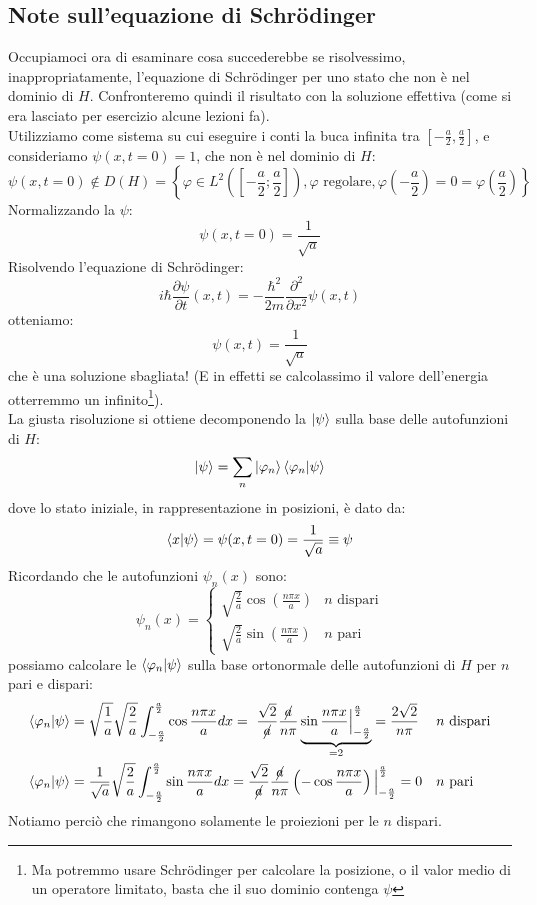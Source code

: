 \documentclass[../../FisicaTeorica.tex]{subfiles}
\begin{document}
\subsection{Note sull'equazione di Schrödinger}
Occupiamoci ora di esaminare cosa succederebbe se risolvessimo, inappropriatamente, l'equazione di Schrödinger per uno stato che non è nel dominio di $H$. Confronteremo quindi il risultato con la soluzione effettiva (come si era lasciato per esercizio alcune lezioni fa).\\
Utilizziamo come sistema su cui eseguire i conti la buca infinita tra $[-\frac{a}{2},\frac{a}{2}]$, e consideriamo $\psi(x,t=0)=1$, che non è nel dominio di $H$:
\[
\psi(x,t=0)\notin D(H) = \left\{\varphi\in L^2\left(\left[-\frac{a}{2}; \frac{a}{2}\right]\right), \varphi \text{ regolare}, \varphi\left(-\frac{a}{2}\right)=0=\varphi\left(\frac{a}{2}\right)\right\}
\]
Normalizzando la $\psi$:
\[
\psi(x,t=0)=\frac{1}{\sqrt{a}}
\]
Risolvendo l'equazione di Schrödinger:
\[
i\hbar \frac{\partial \psi}{\partial t}(x,t) = -\frac{\hbar^2}{2m}\frac{\partial^2}{\partial x^2}\psi(x,t)
\]
otteniamo:
\[
\psi(x,t)=\frac{1}{\sqrt{a}}
\]
che è una soluzione sbagliata! (E in effetti se calcolassimo il valore dell'energia otterremmo un infinito\footnote{Ma potremmo usare Schrödinger per calcolare la posizione, o il valor medio di un operatore limitato, basta che il suo dominio contenga $\psi$}).\\
La giusta risoluzione si ottiene decomponendo la $\ket{\psi}$ sulla base delle autofunzioni di $H$:
\[
\ket{\psi}=\sum_n \ket{\varphi_n}\braket{\varphi_n|\psi}
\]
dove lo stato iniziale, in rappresentazione in posizioni, è dato da:
\[
\braket{x|\psi}=\psi(x,t=0) = \frac{1}{\sqrt{a}} \equiv \psi
\]
Ricordando che le autofunzioni $\psi_n(x)$ sono:
\[
\psi_n(x) = \begin{cases}
\sqrt{\frac{2}{a}}\cos\left(\frac{n\pi x}{a}\right) & \text{$n$ dispari}\\
\sqrt{\frac{2}{a}}\sin\left(\frac{n\pi x}{a}\right) & \text{$n$ pari}
\end{cases}
\]
possiamo calcolare le  $\braket{\varphi_n|\psi}$ sulla base ortonormale delle autofunzioni di $H$ per $n$ pari e dispari:
\begin{align*}
\braket{\varphi_n|\psi}&=\sqrt{\frac{1}{a}}\sqrt{\frac{2}{a}}\int_{-\frac{a}{2}}^{\frac{a}{2}}\cos \frac{n\pi x}{a}dx =\ \frac{\sqrt{2}}{\cancel{a}} \frac{\cancel{a}}{n\pi}
\underbrace{\sin \frac{n\pi x}{a}\Big|_{-\frac{a}{2}}^{\frac{a}{2}}}_{=2}=\frac{2\sqrt{2}}{n\pi} && \text{$n$ dispari}\\
\braket{\varphi_n|\psi}&=\frac{1}{\sqrt{a}}\sqrt{\frac{2}{a}}\int_{-\frac{a}{2}}^{\frac{a}{2}}\sin \frac{n\pi x}{a}dx = \frac{\sqrt{2}}{\cancel{a}}\frac{\cancel{a}}{n\pi}\left(-\cos\frac{n\pi x}{a}\right)\Big|_{-\frac{a}{2}}^{\frac{a}{2}}=0 &&\text{$n$ pari}
\end{align*}
Notiamo perciò che rimangono solamente le proiezioni per le $n$ dispari.\\
\end{document}

